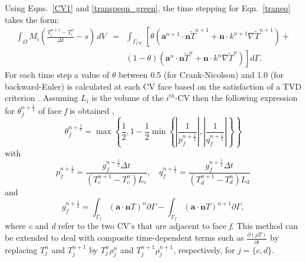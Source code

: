 \documentclass[preprint,authoryear,12pt]{elsarticle}
\begin{document}
Using Eqns.~\ref{CV1} and \ref{transpeqn_green}, the time stepping for Eqn.~\ref{traneq} takes the form:
\begin{eqnarray}
  \int_{\Omega} M_{i} \left( \displaystyle\frac{T_{i}^{n+1}
    -T_{i}^{n}}{\Delta t} - s \right) \,dV &=& \int_{\Gamma_{CV_{i}}}
  \left[\theta\left(\mathbf{a}^{n+1}\cdot \mathbf{n}
    \widetilde{T}^{n+1} +\mathbf{n}\cdot k^{n+1}\nabla
    \widetilde{T}^{n+1} \right) + \right.\nonumber
    \\ &&\left. \left(1-\theta\right)\left(\mathbf{a}^{n}\cdot
    \mathbf{n} \widetilde{T}^{n} +\mathbf{n}\cdot k^{n}\nabla
    \widetilde{T}^{n} \right) \right]d\Gamma.
  \label{theta}
\end{eqnarray} 
For each time step a value of $\theta$ between 0.5 (for Crank-Nicolson) and 1.0 (for backward-Euler) is calculated at each CV face based on the satisfaction of a TVD criterion \citep{szabo_2009,kuzmin_2004}. Assuming $L_{i}$ is the volume of the  $i^{th}$-CV then the following expression for $\theta_f^{n+\frac{1}{2}}$ of face \textit{f} is obtained \citep[see][]{gomes_book_2012},
\begin{equation}
  \theta_f^{n+\frac{1}{2}}=\max \left\{ \frac{1}{2}, 1 - \displaystyle\frac{1}{2}  \min\left\{\left|\frac{1}{p_{f}^{n+\frac{1}{2}}}\right|, \left|\frac{1}{q_{f}^{n+\frac{1}{2}}} \right| \right\} \right\}
  \label{thet1}
\end{equation}
with
\begin{displaymath}
  p_{f}^{n+\frac{1}{2}} = \displaystyle\frac{g_{f}^{n+\frac{1}{2}}\Delta t}{(T^{n+1}_{c} - T_{c}^{n}) L_{c}} , \quad q_{f}^{n+\frac{1}{2}} = \displaystyle\frac{g_{f}^{n+\frac{1}{2}}\Delta t}{(T^{n+1}_{d} - T_{d}^{n}) L_{d}}
  \label{thet2}
\end{displaymath}
and
\begin{displaymath}
  g_f^{n+\frac{1}{2}}= \int_{\Gamma_f}\left(\bm{a} \cdot \mathbf{n} T\right)^{n} \partial\Gamma - \int_{\Gamma_f}\left(\bm{a} \cdot \mathbf{n} T\right)^{n+1}
  \partial\Gamma,
\end{displaymath}
where \textit{c} and \textit{d} refer to the two CV's that are adjacent to face \textit{f}. This method can be extended \citep[as demonstrated in][]{gomes_2008,pain_2001b} to deal with composite time-dependent terms such as $\frac{\partial \left(\rho T\right)}{\partial t}$ by replacing $T_j^n$ and $T_j^{n+1}$ by $T_{j}^{n} \rho_{j}^{n}$ and $T_{j}^{n+1} \rho_j^{n+1}$, respectively, for $j = \{c,d\}$.

\end{document}
